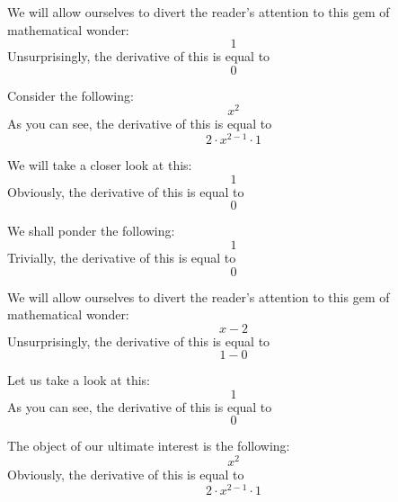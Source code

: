 \documentclass{article}
\begin{document}
We will allow ourselves to divert the reader's attention to this gem of mathematical wonder:
\begin{equation}
1 
\end{equation}
Unsurprisingly, the derivative of this is equal to
\begin{equation}
0 
\end{equation}

Consider the following:
\begin{equation}
x ^{2 } 
\end{equation}
As you can see, the derivative of this is equal to
\begin{equation}
2 \cdot x ^{2 - 1 } \cdot 1 
\end{equation}

We will take a closer look at this:
\begin{equation}
1 
\end{equation}
Obviously, the derivative of this is equal to
\begin{equation}
0 
\end{equation}

We shall ponder the following:
\begin{equation}
1 
\end{equation}
Trivially, the derivative of this is equal to
\begin{equation}
0 
\end{equation}

We will allow ourselves to divert the reader's attention to this gem of mathematical wonder:
\begin{equation}
x - 2 
\end{equation}
Unsurprisingly, the derivative of this is equal to
\begin{equation}
1 - 0 
\end{equation}

Let us take a look at this:
\begin{equation}
1 
\end{equation}
As you can see, the derivative of this is equal to
\begin{equation}
0 
\end{equation}

The object of our ultimate interest is the following:
\begin{equation}
x ^{2 } 
\end{equation}
Obviously, the derivative of this is equal to
\begin{equation}
2 \cdot x ^{2 - 1 } \cdot 1 
\end{equation}
\end{document}
